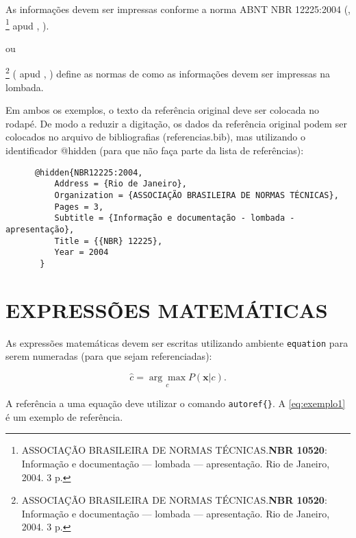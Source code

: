 \begingroup
\begin{adjustwidth}{2cm}{2cm}
    \noindent
	As informações devem ser impressas conforme a norma ABNT NBR 12225:2004 (\citeauthor{nbr12225:2004}, \citeyear{nbr12225:2004}\footnote{ASSOCIAÇÃO BRASILEIRA DE NORMAS TÉCNICAS.\textbf{NBR 10520}: Informação e documentação — lombada — apresentação. Rio de Janeiro, 2004. 3 p.} apud \citeauthor{guiaUCS}, \citeyear{guiaUCS}). 
	
	\centering ou
	
	\justifying
	\noindent\citeauthor{nbr12225:2004}\footnote{ASSOCIAÇÃO BRASILEIRA DE NORMAS TÉCNICAS.\textbf{NBR 10520}: Informação e documentação — lombada — apresentação. Rio de Janeiro, 2004. 3 p.} ( \citeyear{nbr12225:2004} apud \citeauthor{guiaUCS}, \citeyear{guiaUCS}) define as normas de como as informações devem ser impressas na lombada. 
\end{adjustwidth}
\endgroup

Em ambos os exemplos, o texto da referência original deve ser colocada no rodapé. De modo a reduzir a digitação, os dados da referência original podem ser colocados no arquivo de bibliografias (referencias.bib), mas utilizando o identificador @hidden (para que não faça parte da lista de referências):

\begingroup
\fontsize{10pt}{12pt}\selectfont
\begin{verbatim}
      @hidden{NBR12225:2004, 
          Address = {Rio de Janeiro},  
          Organization = {ASSOCIAÇÃO BRASILEIRA DE NORMAS TÉCNICAS}, 
          Pages = 3,  
          Subtitle = {Informação e documentação - lombada - apresentação},
          Title = {{NBR} 12225}, 
          Year = 2004
       }  
\end{verbatim}
\endgroup

\section{EXPRESSÕES MATEMÁTICAS}
\label{sec:expressoes}

As expressões matemáticas devem ser escritas utilizando ambiente \texttt{equation} para serem numeradas (para que sejam referenciadas):

\begin{equation}\label{eq:exemplo1}
\hat{c} = \underset{c}{\arg\max}  P(\textbf{x}|c).
\end{equation}

A referência a uma equação deve utilizar o comando \verb!autoref{}!. A \autoref{eq:exemplo1} é um exemplo de referência. 

